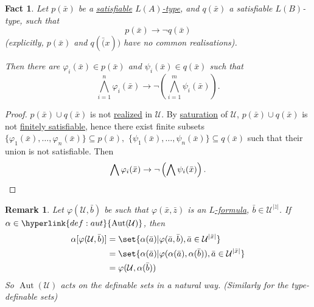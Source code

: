 \documentclass{article}
\DeclareMathOperator{\Aut}{Aut}
\newtheorem{nremark}[nthm]{Remark}
\newtheorem{nfact}[nthm]{Fact}
\begin{document}
\begin{nfact}\label{fact:7.2}
  Let $p(\bar{x})$ be a \hyperlink{def:type}{satisfiable} \hyperlink{def:typeparam}{$L(A)$-type}, and $q(\bar{x})$ a satisfiable $L(B)$-type, such that
  \begin{equation*}p(\bar{x})\to \lnot q(\bar{x})\end{equation*}
  (explicitly, $p(\bar{x})$ and $q(\bar(x))$ have no common realisations).

  Then there are $\varphi_i(\bar{x}) \in p(\bar{x})$ and $\psi_i(\bar{x}) \in q(\bar{x})$ such that
  \begin{equation*} \bigwedge_{i=1}^n\varphi_i(\bar{x})\to \lnot \left(\bigwedge_{i=1}^m\psi_i(\bar{x})\right).\end{equation*}
\end{nfact}
\begin{proof}
  $p(\bar{x})\cup q(\bar{x})$ is not \hyperlink{def:type}{realized} in $\mathcal{U}$.
  By \hyperlink{def:sat}{saturation} of $\mathcal{U}$, $p(\bar{x}) \cup q(\bar{x})$ is not \hyperlink{def:type}{finitely satisfiable},
  hence there exist finite subsets
  $\{\varphi_1(\bar{x}), \dotsc, \varphi_n(\bar{x})\} \subseteq p(\bar{x}),$
  $\{\psi_1(\bar{x}), \dotsc, \psi_n(\bar{x})\}\subseteq q(\bar{x})$
  such that their union is not satisfiable.
  Then
  \begin{equation*} \bigwedge \varphi_i(\bar{x}) \to \lnot\left(\bigwedge \psi_i(\bar{x}) \right). \qedhere \end{equation*}
\end{proof}
\begin{nremark}\label{rem:7.3}
  Let $ \varphi(\mathcal{U},\bar{b}) $ be such that $\varphi(\bar{x},\bar{z})$ is an \hyperlink{def:form}{$L$-formula}, $\bar{b}\in \mathcal{U}^{|\bar{z}|} $.
  If $ \alpha\in\hyperlink{def:aut}{\Aut(\mathcal{U})} $, then
  \begin{align*}
    \alpha[\varphi(\mathcal{U},\bar{b})] &= \set{\alpha(\bar{a})|\varphi(\bar{a},\bar{b}), \bar{a} \in \mathcal{U}^{|\bar{x}|}}\\
                                         &= \set{\alpha(\bar{a})|\varphi(\alpha(\bar{a}),\alpha(\bar{b})), \bar{a} \in \mathcal{U}^{|\bar{x}|}}\\
                                         &= \varphi(\mathcal{U},\alpha(\bar{b}))
  \end{align*}
  So $\Aut(\mathcal{U})$ acts on the definable sets in a natural way. (Similarly for the type-definable sets)
\end{nremark}
\end{document}

